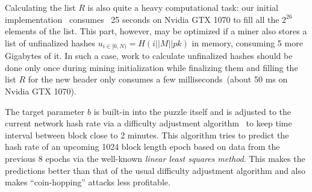 Calculating the list $R$ is also quite a heavy computational task: our initial implementation~\cite{ergoMiner}
consumes ~25 seconds on Nvidia GTX 1070 to fill all the $2^{26}$ elements of the list.
This part, however, may be optimized if a miner also stores a list of unfinalized hashes $u_{i \in [0,N)}=H(i||M||pk)$
in memory, consuming 5 more Gigabytes of it. In such a case, work to calculate unfinalized hashes should
be done only once during mining initialization while finalizing them and filling the list $R$
for the new header only consumes a few milliseconds~(about 50 ms on Nvidia GTX 1070).

The target parameter $b$ is built-in into the puzzle itself
and is adjusted to the current network hash rate via a difficulty adjustment
algorithm~\cite{meshkov2017short} to keep time interval between block close to 2 minutes.
This algorithm tries to predict the hash rate of an upcoming 1024 block length epoch
based on data from the previous 8 epochs via the well-known {\em linear least squares method}.
This makes the predictions better than that of the usual difficulty adjustment algorithm and also makes ``coin-hopping'' attacks less profitable.